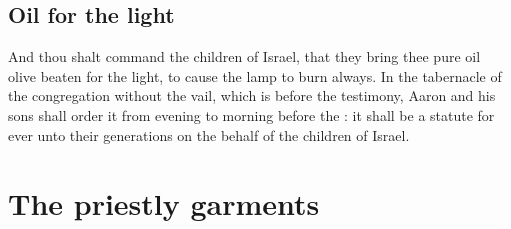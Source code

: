 \begin{biblechapter}
\section*{Oil for the light}
\verse And thou shalt command the children of Israel, that they bring thee pure oil olive beaten for the light, to cause the lamp to burn always.
\verse In the tabernacle of the congregation without the vail, which is before the testimony, Aaron and his sons shall order it from evening to morning before the \LORD: it shall be a statute for ever unto their generations on the behalf of the children of Israel.
\end{biblechapter}

\section*{The priestly garments}
